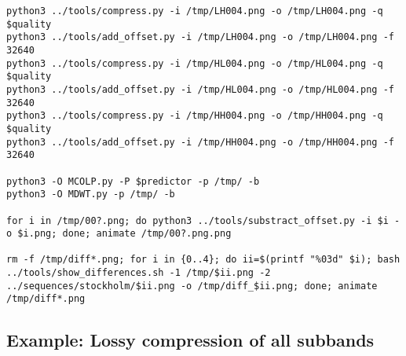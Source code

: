 \begin{verbatim}
python3 ../tools/compress.py -i /tmp/LH004.png -o /tmp/LH004.png -q $quality
python3 ../tools/add_offset.py -i /tmp/LH004.png -o /tmp/LH004.png -f 32640
python3 ../tools/compress.py -i /tmp/HL004.png -o /tmp/HL004.png -q $quality
python3 ../tools/add_offset.py -i /tmp/HL004.png -o /tmp/HL004.png -f 32640
python3 ../tools/compress.py -i /tmp/HH004.png -o /tmp/HH004.png -q $quality
python3 ../tools/add_offset.py -i /tmp/HH004.png -o /tmp/HH004.png -f 32640

python3 -O MCOLP.py -P $predictor -p /tmp/ -b
python3 -O MDWT.py -p /tmp/ -b

for i in /tmp/00?.png; do python3 ../tools/substract_offset.py -i $i -o $i.png; done; animate /tmp/00?.png.png

rm -f /tmp/diff*.png; for i in {0..4}; do ii=$(printf "%03d" $i); bash ../tools/show_differences.sh -1 /tmp/$ii.png -2 ../sequences/stockholm/$ii.png -o /tmp/diff_$ii.png; done; animate /tmp/diff*.png
\end{verbatim}


\subsection*{Example: Lossy compression of all subbands}

